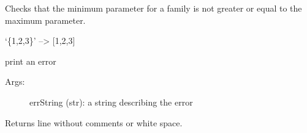 \documentclass[letterpaper,10pt,english]{sphinxmanual}
\begin{document}
\begin{fulllineitems}
\begin{fulllineitems}
\end{fulllineitems}


\begin{fulllineitems}
\label{\detokenize{pydfnworks:pydfnworks.helper.input_helper.check_min_max}}
Checks that the minimum parameter for a family is not greater or equal to the maximum parameter.

\end{fulllineitems}


\begin{fulllineitems}
\label{\detokenize{pydfnworks:pydfnworks.helper.input_helper.curly_to_list}}
`\{1,2,3\}' --\textgreater{} {[}1,2,3{]}

\end{fulllineitems}


\begin{fulllineitems}
\label{\detokenize{pydfnworks:pydfnworks.helper.input_helper.error}}
print an error
\begin{description}
\item[{Args:}] \leavevmode
errString (str): a string describing the error

\end{description}

\end{fulllineitems}


\begin{fulllineitems}
\label{\detokenize{pydfnworks:pydfnworks.helper.input_helper.extract_parameters}}
Returns line without comments or white space.

\end{fulllineitems}



\end{fulllineitems}
\end{document}
